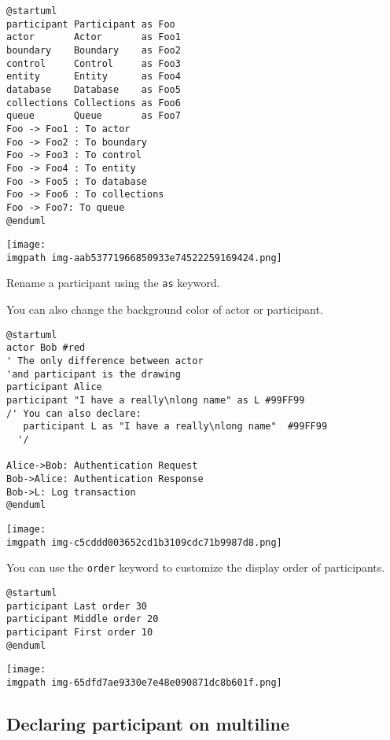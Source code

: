 \begin{verbatim}
@startuml
participant Participant as Foo
actor       Actor       as Foo1
boundary    Boundary    as Foo2
control     Control     as Foo3
entity      Entity      as Foo4
database    Database    as Foo5
collections Collections as Foo6
queue       Queue       as Foo7
Foo -> Foo1 : To actor 
Foo -> Foo2 : To boundary
Foo -> Foo3 : To control
Foo -> Foo4 : To entity
Foo -> Foo5 : To database
Foo -> Foo6 : To collections
Foo -> Foo7: To queue
@enduml
\end{verbatim}
\begin{center}
\texttt{[image: \\imgpath img-aab53771966850933e74522259169424.png]}
\end{center}


Rename a participant using the \texttt{as} keyword.


You can also change the background color of
actor or participant.


\begin{verbatim}
@startuml
actor Bob #red
' The only difference between actor
'and participant is the drawing
participant Alice
participant "I have a really\nlong name" as L #99FF99
/' You can also declare:
   participant L as "I have a really\nlong name"  #99FF99
  '/

Alice->Bob: Authentication Request
Bob->Alice: Authentication Response
Bob->L: Log transaction
@enduml
\end{verbatim}
\begin{center}
\texttt{[image: \\imgpath img-c5cddd003652cd1b3109cdc71b9987d8.png]}
\end{center}


You can use the \texttt{order} keyword to customize the display order of participants.


\begin{verbatim}
@startuml
participant Last order 30
participant Middle order 20
participant First order 10
@enduml
\end{verbatim}
\begin{center}
\texttt{[image: \\imgpath img-65dfd7ae9330e7e48e090871dc8b601f.png]}
\end{center}
%
%
\subsection{Declaring participant on multiline}


